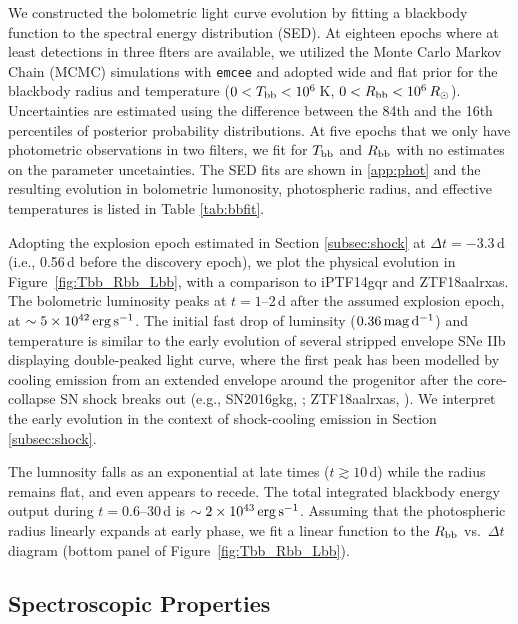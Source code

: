 \documentclass[twocolumn]{aastex63}
\begin{document}
\begin{CJK*}{UTF8}{gbsn}
We constructed the bolometric light curve evolution by fitting a blackbody function to the spectral 
energy distribution (SED). At eighteen epochs where at least detections in three flters are available, we 
utilized the Monte Carlo Markov Chain (MCMC) simulations with \texttt{emcee} 
\citep{Foreman-Mackey2013} and adopted wide and flat prior for the blackbody radius and 
temperature ($0<T_{\rm bb}<10^6$\,K, $0<R_{\rm bb}<10^6\,R_\odot$). Uncertainties are estimated 
using the difference between the 84th and the 16th percentiles of posterior probability distributions. At 
five epochs that we only have photometric observations in two filters, we fit for $T_{\rm bb}$ and 
$R_{\rm bb}$ with no estimates on the parameter uncetainties. The SED fits are shown in 
\ref{app:phot} and the resulting evolution in bolometric lumonosity, photospheric radius, 
and effective temperatures is listed in Table  \ref{tab:bbfit}. 

Adopting the explosion epoch estimated in Section \ref{subsec:shock} at $\Delta t=-3.3$\,d (i.e., 
0.56\,d before the discovery epoch), we plot the physical evolution in Figure~\ref{fig:Tbb_Rbb_Lbb}, 
with a comparison to iPTF14gqr and ZTF18aalrxas. The bolometric luminosity peaks at $ t=1$--2\,d 
after the assumed explosion epoch, at $\sim 5\times 10^{42}\,{\rm erg\, s^{-1}}$. The initial fast drop of 
luminsity ($0.36\,{\rm mag\,d^{-1}}$) and temperature is similar to the early evolution of several 
stripped envelope SNe IIb displaying double-peaked light curve, where the first peak has been modelled 
by cooling emission from an extended envelope around the progenitor after the core-collapse SN 
shock breaks out (e.g., SN2016gkg, \citealt{Arcavi2017}; ZTF18aalrxas, \citealt{Fremling2019}). We 
interpret the early evolution in the context of shock-cooling emission in Section \ref{subsec:shock}.

The lumnosity falls as an exponential at late times ($ t \gtrsim 10$\,d) while the radius remains flat, and 
even appears to recede. The total integrated blackbody energy output during $ t = 0.6$--30\,d is $\sim 
2\times 10^{43}\,{\rm erg\,s^{-1}}$. Assuming that the photospheric radius linearly expands at early 
phase, we fit a linear function to the $R_{\rm bb}$ vs.~$\Delta t$ diagram (bottom panel of 
Figure~\ref{fig:Tbb_Rbb_Lbb}). 

\subsection{Spectroscopic Properties}\label{subsec:spec_properties}

\end{CJK*}
\end{document}

